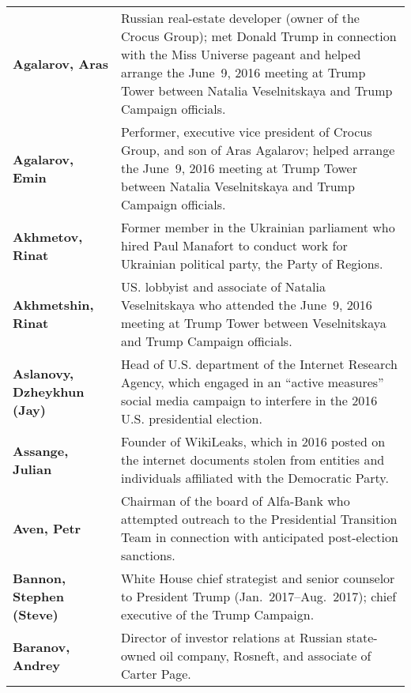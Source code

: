 \begin{longtable}{ p{} p{} }

    \textbf{Agalarov, Aras} & Russian real-estate developer (owner of the Crocus Group); met Donald Trump in connection with the Miss Universe pageant and helped arrange the June~9, 2016 meeting at Trump Tower between Natalia Veselnitskaya and Trump Campaign officials. \\

    \textbf{Agalarov, Emin} & Performer, executive vice president of Crocus Group, and son of Aras Agalarov; helped arrange the June~9, 2016 meeting at Trump Tower between Natalia Veselnitskaya and Trump Campaign officials. \\

    \textbf{Akhmetov, Rinat} & Former member in the Ukrainian parliament who hired Paul Manafort to conduct work for Ukrainian political party, the Party of Regions. \\

    \textbf{Akhmetshin, Rinat} & US. lobbyist and associate of Natalia Veselnitskaya who attended the June~9, 2016 meeting at Trump Tower between Veselnitskaya and Trump Campaign officials. \\

    \textbf{Aslanovy, Dzheykhun (Jay)} & Head of U.S. department of the Internet Research Agency, which engaged in an ``active measures'' social media campaign to interfere in the 2016 U.S. presidential election. \\

    \textbf{Assange, Julian} & Founder of WikiLeaks, which in 2016 posted on the internet documents stolen from entities and individuals affiliated with the Democratic Party. \\

    \textbf{Aven, Petr} & Chairman of the board of Alfa-Bank who attempted outreach to the Presidential Transition Team in connection with anticipated post-election sanctions. \\

    \textbf{Bannon, Stephen (Steve)} & White House chief strategist and senior counselor to President Trump (Jan.~2017--Aug.~2017); chief executive of the Trump Campaign. \\

    \textbf{Baranov, Andrey} & Director of investor relations at Russian state-owned oil company, Rosneft, and associate of Carter Page. \\


\end{longtable}
